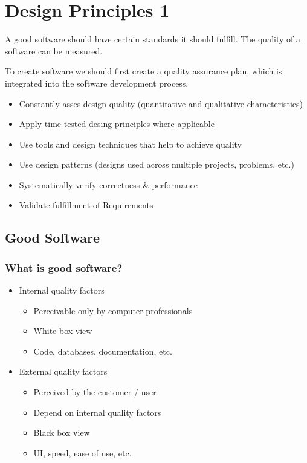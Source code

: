 \documentclass[
../../Software_Engineering_Summary.tex,
]
{subfiles}
\begin{document}
\section{Design Principles 1}
A good software should have certain standards it should fulfill. The quality of a software can be measured.

\begin{defbox}
    To create software we should first create a quality assurance plan, which is integrated into the software development process.

    \begin{itemize}
        \item Constantly asses design quality (quantitative and qualitative characteristics)
        \item Apply time-tested desing principles where applicable
        \item Use tools and design techniques that help to achieve quality
        \item Use design patterns (designs used across multiple projects, problems, etc.)
        \item Systematically verify correctness \& performance
        \item Validate fulfillment of Requirements
    \end{itemize}
\end{defbox}

\subsection{Good Software}
\subsubsection*{What is good software?}
    \begin{itemize}
        \item Internal quality factors
        \begin{itemize}
            \item Perceivable only by computer professionals 
            \item White box view
            \item Code, databases, documentation, etc.
        \end{itemize}
        \item External quality factors
        \begin{itemize}
            \item Perceived by the customer / user
            \item Depend on internal quality factors
            \item Black box view
            \item UI, speed, ease of use, etc.
        \end{itemize}
    \end{itemize}
\end{document}
